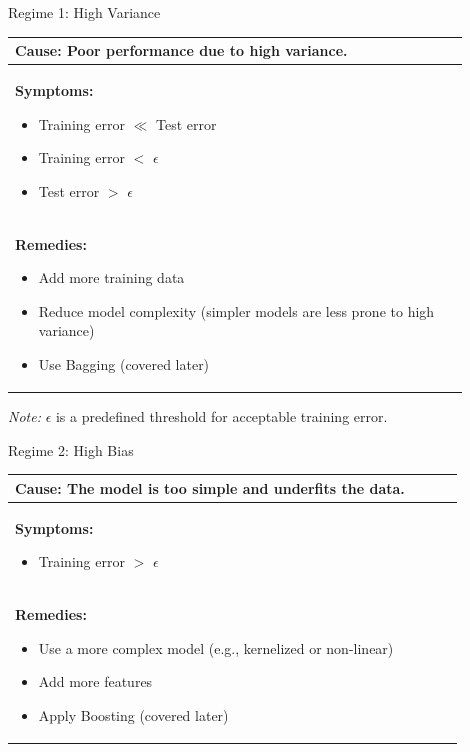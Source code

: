 \documentclass[serif, aspectratio=169]{beamer}
\begin{document}
\begin{frame}{Regime 1: High Variance}
\centering
\renewcommand{\arraystretch}{1.3}
\begin{tabular}{|p{0.9\linewidth}|}
\hline
\textbf{Cause:} Poor performance due to high variance. \\ \hline

\textbf{Symptoms:}
\begin{itemize}
    \item Training error $\ll$ Test error
    \item Training error $<$ $\epsilon$
    \item Test error $>$ $\epsilon$
\end{itemize} \\ \hline

\textbf{Remedies:}
\begin{itemize}
    \item Add more training data
    \item Reduce model complexity (simpler models are less prone to high variance)
    \item Use Bagging (covered later)
\end{itemize} \\ \hline
\end{tabular}


\vspace{0.3cm}
\textit{Note:} $\epsilon$ is a predefined threshold for acceptable training error.
\end{frame}


\begin{frame}{Regime 2: High Bias}
\centering
\renewcommand{\arraystretch}{1.3}
\begin{tabular}{|p{0.9\linewidth}|}
\hline
\textbf{Cause:} The model is too simple and underfits the data. \\ \hline

\textbf{Symptoms:}
\begin{itemize}
    \item Training error $>$ $\epsilon$
\end{itemize} \\ \hline

\textbf{Remedies:}
\begin{itemize}
    \item Use a more complex model (e.g., kernelized or non-linear)
    \item Add more features
    \item Apply Boosting (covered later)
\end{itemize} \\ \hline
\end{tabular}
\end{frame}
\end{document}
